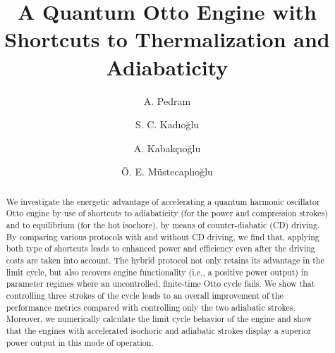 \documentclass[aps,pra,twocolumn,showpacs,showkeys,groupedaddress,nobalancelastpage,nofootinbib,floatfix,superscriptaddress,longbibliography]{revtex4-2}
\begin{document}
\newcommand\be{\begin{equation}}
\newcommand\ee{\end{equation}}
\newcommand\bea{\begin{eqnarray}}
\newcommand\eea{\end{eqnarray}}
\newcommand\ket[1]{|#1\rangle}
\newcommand\bra[1]{\langle #1|}
\newcommand\braket[2]{\langle #1|#2\rangle}
\def\dbar{{\mathchar'26\mkern-12mu d}} %
 \newtheorem{thm}{Theorem}
 \newtheorem{cor}[thm]{Corollary}
 \newtheorem{lem}[thm]{Lemma}
 \newtheorem{prop}[thm]{Proposition}
 \newtheorem{defn}[thm]{Definition}
 \newtheorem{rem}[thm]{Remark}

\pagestyle{plain}
\title{\bf A Quantum Otto Engine with Shortcuts to Thermalization and Adiabaticity}
\author{ A. Pedram}
\author{ S. C. Kadıoğlu}
\author{A. Kabakçıoğlu}
\author{Ö. E. Müstecaplıoğlu}
\pagebreak

\begin{abstract}
  We investigate the energetic advantage of accelerating a quantum harmonic oscillator Otto engine by use of shortcuts to adiabaticity (for the power and compression strokes) and to equilibrium (for the hot isochore), by means of counter-diabatic (CD) driving. By comparing various protocols with and without CD driving, we find that, applying both type of shortcuts leads to enhanced power and efficiency even after the driving costs are taken into account. The hybrid protocol not only retains its advantage in the limit cycle, but also recovers engine functionality (i.e., a positive power output) in parameter regimes where an uncontrolled, finite-time Otto cycle fails. We show that controlling three strokes of the cycle leads to an overall improvement of the performance metrics compared with controlling only the two adiabatic strokes. Moreover, we numerically calculate the limit cycle behavior of the engine and show that the engines with accelerated isochoric and adiabatic strokes display a superior power output in this mode of operation. 
\end{abstract}
\maketitle
\end{document}
